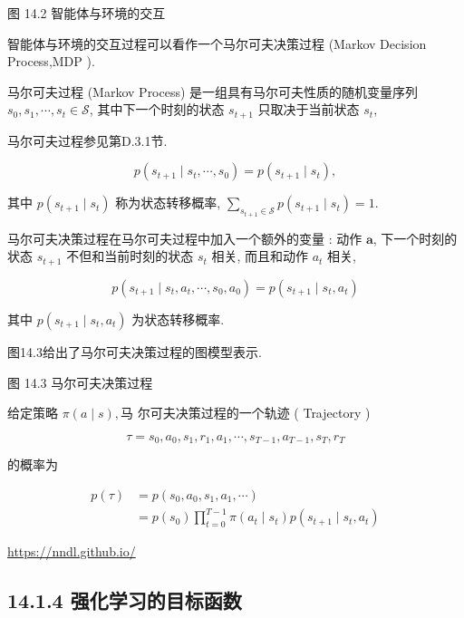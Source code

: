 \documentclass[10pt]{article}
\begin{document}
图 14.2 智能体与环境的交互

智能体与环境的交互过程可以看作一个马尔可夫决策过程 (Markov Decision Process,MDP ).

马尔可夫过程 (Markov Process) 是一组具有马尔可夫性质的随机变量序列 $s_{0}, s_{1}, \cdots, s_{t} \in \mathcal{S}$, 其中下一个时刻的状态 $s_{t+1}$ 只取决于当前状态 $s_{t}$,

马尔可夫过程参见第D.3.1节.


\begin{equation*}
p\left(s_{t+1} \mid s_{t}, \cdots, s_{0}\right)=p\left(s_{t+1} \mid s_{t}\right), \tag{14.4}
\end{equation*}


其中 $p\left(s_{t+1} \mid s_{t}\right)$ 称为状态转移概率, $\sum_{s_{t+1} \in \mathcal{S}} p\left(s_{t+1} \mid s_{t}\right)=1$.

马尔可夫决策过程在马尔可夫过程中加入一个额外的变量 : 动作 $\boldsymbol{a}$, 下一个时刻的状态 $s_{t+1}$ 不但和当前时刻的状态 $s_{t}$ 相关, 而且和动作 $a_{t}$ 相关,


\begin{equation*}
p\left(s_{t+1} \mid s_{t}, a_{t}, \cdots, s_{0}, a_{0}\right)=p\left(s_{t+1} \mid s_{t}, a_{t}\right) \tag{14.5}
\end{equation*}


其中 $p\left(s_{t+1} \mid s_{t}, a_{t}\right)$ 为状态转移概率.

图14.3给出了马尔可夫决策过程的图模型表示.



图 14.3 马尔可夫决策过程

给定策略 $\pi(a \mid s), 马$ 尔可夫决策过程的一个轨迹 ( Trajectory )

$$
\tau=s_{0}, a_{0}, s_{1}, r_{1}, a_{1}, \cdots, s_{T-1}, a_{T-1}, s_{T}, r_{T}
$$

的概率为


\begin{align*}
p(\tau) & =p\left(s_{0}, a_{0}, s_{1}, a_{1}, \cdots\right)  \tag{14.6}\\
& =p\left(s_{0}\right) \prod_{t=0}^{T-1} \pi\left(a_{t} \mid s_{t}\right) p\left(s_{t+1} \mid s_{t}, a_{t}\right) \tag{14.7}
\end{align*}


\href{https://nndl.github.io/}{https://nndl.github.io/}

\subsection*{14.1.4 强化学习的目标函数}
\end{document}
